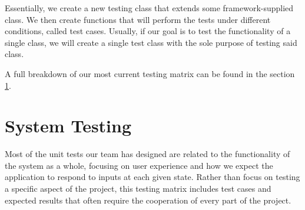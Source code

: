 Essentially, we create a new testing class that extends some framework-supplied
class. We then create functions that will perform the tests under different
conditions, called test cases. Usually, if our goal is to test the functionality
of a single class, we will create a single test class with the sole purpose of
testing said class.

A full breakdown of our most current testing matrix can be found in the
section \ref{systemTesting}.


\section{System Testing} \label{systemTesting}

Most of the unit tests our team has designed are related to the functionality of
the system as a whole, focusing on user experience and how we expect the
application to respond to inputs at each given state. Rather than focus on
testing a specific aspect of the project, this testing matrix includes test
cases and expected results that often require the cooperation of every part of
the project.

